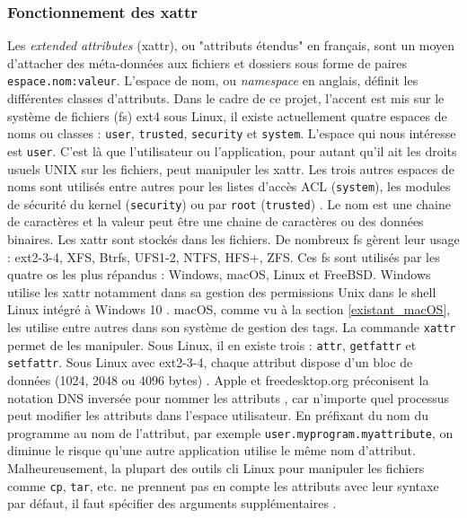 \subsubsection{Fonctionnement des \acrshort{xattr}}
Les \textit{extended attributes} (\acrshort{xattr}), ou "attributs étendus" en français, sont un moyen d'attacher des 
méta-données aux fichiers et dossiers sous forme de paires \texttt{espace.nom:valeur}. 
L'espace de nom, ou \textit{namespace} en anglais, définit les différentes classes d'attributs. 
Dans le cadre de ce projet, l'accent est mis sur le système de fichiers (\acrshort{fs}) ext4 \cite{ref36}
sous Linux, il existe actuellement quatre espaces de noms 
ou classes : \texttt{user}, \texttt{trusted}, \texttt{security} et 
\texttt{system}. L'espace qui nous intéresse est \texttt{user}. C'est là que 
l'utilisateur ou l'application, pour autant qu'il ait les droits usuels UNIX sur les fichiers, peut 
manipuler les \acrshort{xattr}. Les trois autres espaces de noms sont utilisés entre autres pour 
les listes d'accès ACL (\texttt{system}), les modules de sécurité du kernel 
(\texttt{security}) ou par \texttt{root} (\texttt{trusted})
\cite{ref11} \cite{ref12}.
Le nom est une chaine de caractères et la valeur peut être une chaine de caractères ou des données binaires. 
Les \acrshort{xattr} sont stockés dans les fichiers. De nombreux \acrshort{fs} gèrent leur 
usage : ext2-3-4, XFS, Btrfs, UFS1-2, NTFS, HFS+, ZFS. Ces \acrshort{fs} sont utilisés par 
les quatre \acrshort{os} les plus répandus : Windows, macOS, Linux et FreeBSD. Windows utilise 
les \acrshort{xattr} notamment dans sa gestion des permissions Unix dans le shell Linux intégré 
à Windows 10 \cite{ref21}. macOS, comme vu à la section \ref{existant_macOS}, les utilise entre 
autres dans son système de gestion des tags. La commande \texttt{xattr} permet de les 
manipuler. Sous Linux, il en existe trois : \texttt{attr}, \texttt{getfattr} et 
\texttt{setfattr}. Sous Linux avec ext2-3-4, chaque attribut dispose d'un bloc de données 
(1024, 2048 ou 4096 bytes) \cite{ref12}.
Apple et freedesktop.org préconisent la notation DNS inversée pour 
nommer les attributs \cite{ref8}, \cite{ref24} car n'importe quel processus peut modifier les 
attributs dans l'espace utilisateur. En préfixant du nom du programme au nom de l'attribut, par 
exemple \texttt{user.myprogram.myattribute}, on diminue le risque qu'une autre 
application utilise le même nom d'attribut. Malheureusement, la plupart des outils \acrshort{cli} Linux 
pour manipuler les fichiers comme \texttt{cp}, \texttt{tar}, etc. ne prennent 
pas en compte les attributs avec leur syntaxe par défaut, il faut spécifier des arguments supplémentaires \cite{ref4}.

